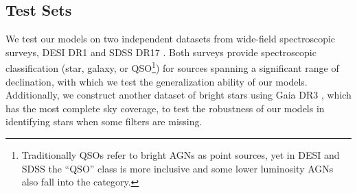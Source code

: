 \documentclass[twocolumn]{aastex631}
\newcommand{\dr}[1]{DR{#1}}
\begin{document}
\begin{CJK*}{UTF8}{gbsn}
\subsection{Test Sets}
We test our models on two independent datasets from wide-field spectroscopic surveys, DESI \dr{1} \citep{DESI_DR1_2025} and SDSS \dr{17} \citep{SDSS_2022}. Both surveys provide spectroscopic classification (star, galaxy, or QSO\footnote{Traditionally QSOs refer to bright AGNs as point sources, yet in DESI and SDSS the ``QSO'' class is more inclusive and some lower luminosity AGNs also fall into the category.}) for sources spanning a significant range of declination, with which we test the generalization ability of our models. Additionally, we construct another dataset of bright stars using Gaia \dr{3} \citep{GaiaDR3_2023}, which has the most complete sky coverage, to test the robustness of our models in identifying stars when some filters are missing.


\end{CJK*}
\end{document}
